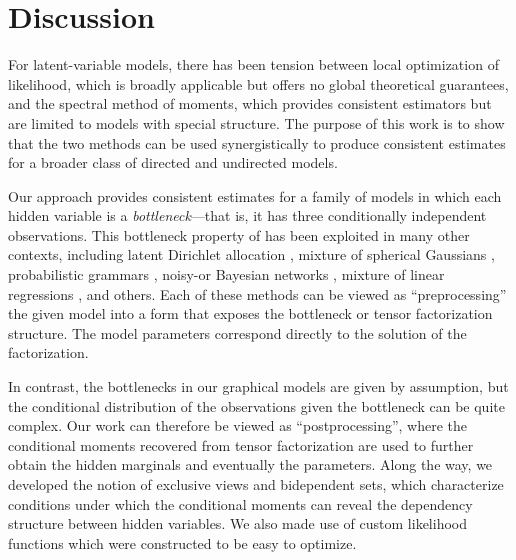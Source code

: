 \section{Discussion}
\label{sec:discussion}

For latent-variable models,
there has been tension between
local optimization of likelihood,
which is broadly applicable but offers no global theoretical guarantees,
and the spectral method of moments, which provides consistent estimators
but are limited to models with special structure.
The purpose of this work is to show that the two methods
can be used synergistically to produce consistent estimates
for a broader class of directed and undirected models.

Our approach provides consistent estimates for
a family of models in which each hidden variable is a \emph{bottleneck}---that is,
it has three conditionally independent observations.
This bottleneck property of \citet{anandkumar13tensor}
has been exploited in many other contexts,
including latent Dirichlet allocation \cite{anandkumar12lda},
mixture of spherical Gaussians \cite{hsu13spherical},
probabilistic grammars \cite{hsu12identifiability},
noisy-or Bayesian networks \cite{halpern2013unsupervised},
mixture of linear regressions \cite{chaganty13regression},
and others.
Each of these methods can be viewed as ``preprocessing'' the given model into a
form that exposes the bottleneck or tensor factorization structure.
The model parameters correspond directly to the solution of the factorization.

In contrast, the bottlenecks in our graphical models are given by assumption,
but the conditional distribution of the observations given the bottleneck
can be quite complex.
Our work can therefore be viewed as ``postprocessing'',
where the conditional moments recovered from tensor factorization
are used to further obtain the hidden marginals and eventually the parameters.
Along the way, we developed the notion of exclusive views and bidependent sets,
which characterize conditions under which the conditional moments can reveal
the dependency structure between hidden variables.
We also made use of custom likelihood functions which were constructed to be
easy to optimize.


